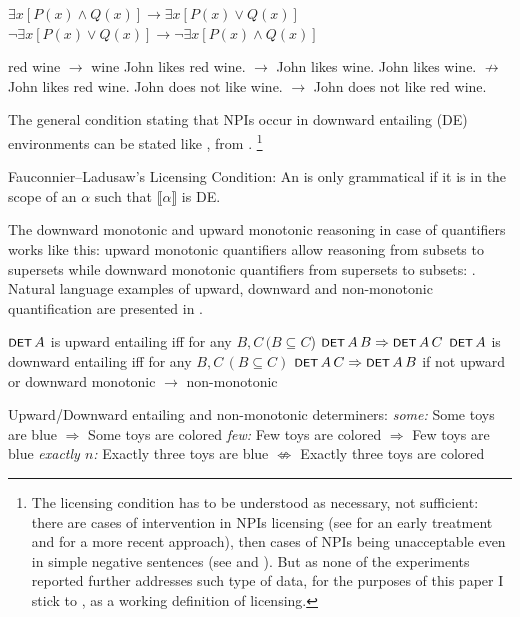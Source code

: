 \documentclass[output=paper, colorlinks, citecolor=brown, newtxmath]{langsci/langscibook}
\begin{document}
\ea \label{ex-11} \ea \label{ex-11-a} $\exists x[P(x) \wedge Q(x)] \rightarrow \exists x[P(x) \vee Q(x)]$
\ex \label{ex-11-b} $\neg \exists x[P(x) \vee Q(x)] \rightarrow \neg \exists x[P(x) \wedge Q(x)]$
\z
\z

\ea\label{ex-12} red wine $\rightarrow$ wine
\ea\label{ex-12-a} John likes red wine. $\rightarrow$ John likes wine.
\ex\label{ex-12-b} John likes wine. $\not\rightarrow$ John likes red wine.
\ex\label{ex-12-c} John does not like wine. $\rightarrow$ John does not like red wine.
\z
\z

\noindent The general condition stating that NPIs occur in  downward entailing (DE) environments can be stated like , from \citep[100]{von1999npi}.%
\footnote{The licensing condition has to be understood as necessary, not sufficient: there are cases of intervention in NPIs licensing (see \citealt{linebarger1987negative} for an early treatment and \citealt{homer2008disruption} for a more recent approach), then cases of NPIs being unacceptable even in simple negative sentences (see \citealt{uribe1994interface} and \citealt{Blasczak:2001}). But as none of the experiments reported further addresses such type of data, for the purposes of this paper I stick to , as a working definition of  licensing.}

\eanoraggedright\label{ex-13} Fauconnier--Ladusaw's Licensing Condition: An  is only
grammatical if it is in the scope of an $\alpha$ such that
$\llbracket \alpha \rrbracket$ is DE.%
\z

\noindent The downward monotonic and upward monotonic reasoning in case of quantifiers works like this:  upward monotonic quantifiers allow reasoning from  subsets to supersets while downward monotonic quantifiers from  supersets to subsets: . Natural language examples of upward, downward and non-monotonic quantification are presented in .

\ea \label{ex-14} \ea $\cnst{det}\,A$ is upward entailing iff for any $B, C\, (B \subseteq C$) $\cnst{det}\,A\,B \Rightarrow \cnst{det}\,A\,C$
\ex $\cnst{det}\,A$ is downward entailing iff
for any $B, C\,(B \subseteq C)$ $\cnst{det}\,A\,C \Rightarrow \cnst{det}\,A\,B$
\ex if not upward or downward monotonic $\rightarrow$ non-monotonic
\z
\z

\ea \label{ex-15} Upward/Downward entailing and non-monotonic determiners:
\ea \textit{some:} Some toys are blue $\Rightarrow$ Some toys are colored
\ex \textit{few:} Few toys are colored $\Rightarrow$ Few toys are blue
\ex \textit{exactly $n$:} Exactly three toys are blue $\not\Leftrightarrow$ Exactly three toys are colored
\z
\z
\end{document}
